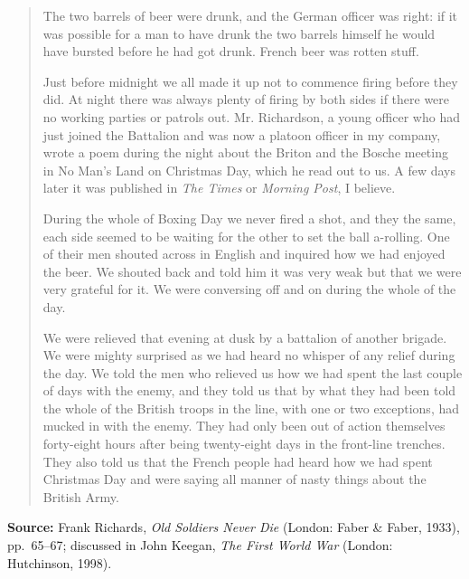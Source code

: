 \begin{quote}
The two barrels of beer were drunk, and the German officer was right: if it was possible for a man to have drunk the two barrels himself he would have bursted before he had got drunk. French beer was rotten stuff.

Just before midnight we all made it up not to commence firing before they did. At night there was always plenty of firing by both sides if there were no working parties or patrols out. Mr. Richardson, a young officer who had just joined the Battalion and was now a platoon officer in my company, wrote a poem during the night about the Briton and the Bosche meeting in No Man’s Land on Christmas Day, which he read out to us. A few days later it was published in \textit{The Times} or \textit{Morning Post}, I believe.

During the whole of Boxing Day we never fired a shot, and they the same, each side seemed to be waiting for the other to set the ball a-rolling. One of their men shouted across in English and inquired how we had enjoyed the beer. We shouted back and told him it was very weak but that we were very grateful for it. We were conversing off and on during the whole of the day.

We were relieved that evening at dusk by a battalion of another brigade. We were mighty surprised as we had heard no whisper of any relief during the day. We told the men who relieved us how we had spent the last couple of days with the enemy, and they told us that by what they had been told the whole of the British troops in the line, with one or two exceptions, had mucked in with the enemy. They had only been out of action themselves forty-eight hours after being twenty-eight days in the front-line trenches. They also told us that the French people had heard how we had spent Christmas Day and were saying all manner of nasty things about the British Army.
\end{quote}

\vspace{0.5em}

\noindent\textbf{Source:} Frank Richards, \textit{Old Soldiers Never Die} (London: Faber \& Faber, 1933), pp.~65–67; discussed in John Keegan, \textit{The First World War} (London: Hutchinson, 1998).

